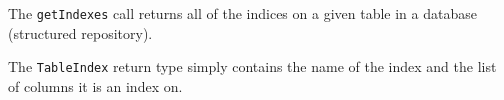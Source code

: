 The \verb+getIndexes+ call returns all of the indices on a given table in a database (structured repository).

The \verb+TableIndex+ return type simply contains the name of the index and the list of columns it is an index on.
